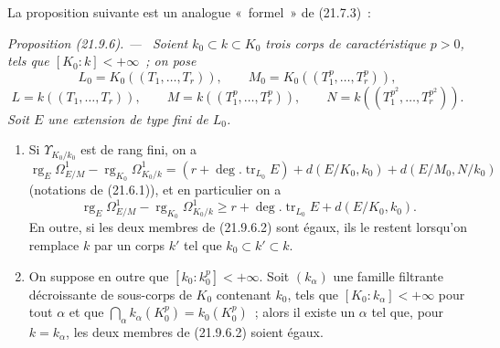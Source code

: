 \documentclass[10pt,oneside]{book}
\makeatletter
\newcommand{\setmanualcurrentlabel}[1]{\def\@currentlabel{#1}}
\newenvironment{proposition}[1][]{%
  \setmanualcurrentlabel{#1}\par\medskip\noindent\itshape Proposition (#1). ---\ }{\par}
\makeatother
\begin{document}
La proposition suivante est un analogue «~formel~» de (21.7.3)~:

\begin{proposition}[21.9.6]
\label{0.21.9.6-fr}
Soient $k_0\subset k\subset K_0$ trois corps de caractéristique $p>0$, tels
que $[K_0:k]<+\infty$~; on pose
\[
  L_0=K_0((T_1,\ldots,T_r)),\qquad
  M_0=K_0((T_1^p,\ldots,T_r^p)),
\]
\[
  L=k((T_1,\ldots,T_r)),\qquad
  M=k((T_1^p,\ldots,T_r^p)),\qquad
  N=k((T_1^{p^2},\ldots,T_r^{p^2})).
\]
Soit $E$ une extension de type fini de $L_0$.
\begin{enumerate}
  \item[(i)] Si $\Upsilon_{K_0/k_0}$ est de rang fini, on a
  \begin{equation}
  \tag{21.9.6.1}
  \label{0.21.9.6.1-fr}
    \operatorname{rg}_E\Omega^1_{E/M}
    -\operatorname{rg}_{K_0}\Omega^1_{K_0/k}
    =(r+\deg.\operatorname{tr}_{L_0}E)
      +d(E/K_0,k_0)+d(E/M_0,N/k_0)
  \end{equation}
  (notations de (21.6.1)), et en particulier on a
  \begin{equation}
  \tag{21.9.6.2}
  \label{0.21.9.6.2-fr}
    \operatorname{rg}_E\Omega^1_{E/M}
    -\operatorname{rg}_{K_0}\Omega^1_{K_0/k}
    \geqslant r+\deg.\operatorname{tr}_{L_0}E+d(E/K_0,k_0).
  \end{equation}
  En outre, si les deux membres de (21.9.6.2) sont égaux, ils le restent
  lorsqu'on remplace $k$ par un corps $k'$ tel que $k_0\subset k'\subset k$.

  \item[(ii)] On suppose en outre que $[k_0:k_0^p]<+\infty$. Soit
  $(k_\alpha)$ une famille filtrante décroissante de sous-corps de $K_0$
  contenant $k_0$, tels que $[K_0:k_\alpha]<+\infty$ pour tout $\alpha$ et
  que
  $\bigcap_\alpha k_\alpha(K_0^p)=k_0(K_0^p)$~; alors il existe un $\alpha$
  tel que, pour $k=k_\alpha$, les deux membres de (21.9.6.2) soient égaux.
\end{enumerate}
\end{proposition}
\end{document}
